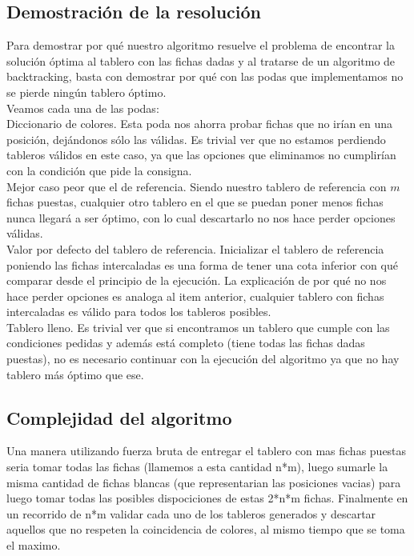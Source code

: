 \subsection{Demostraci\'on de la resoluci\'on}

Para demostrar por qu\'e nuestro algoritmo resuelve el problema de encontrar la soluci\'on \'optima al tablero con las fichas dadas y al tratarse de un algoritmo de backtracking, basta con demostrar por qu\'e con las podas que implementamos no se pierde ning\'un tablero \'optimo.\\

Veamos cada una de las podas:\\

Diccionario de colores. Esta poda nos ahorra probar fichas que no ir\'ian en una posici\'on, dej\'andonos s\'olo las v\'alidas. Es trivial ver que no estamos perdiendo tableros v\'alidos en este caso, ya que las opciones que eliminamos no cumplir\'ian con la condici\'on que pide la consigna.\\

Mejor caso peor que el de referencia. Siendo nuestro tablero de referencia con $m$ fichas puestas, cualquier otro tablero en el que se puedan poner menos fichas nunca llegar\'a a ser \'optimo, con lo cual descartarlo no nos hace perder opciones v\'alidas.\\

Valor por defecto del tablero de referencia. Inicializar el tablero de referencia poniendo las fichas intercaladas es una forma de tener una cota inferior con qu\'e comparar desde el principio de la ejecuci\'on. La explicaci\'on de por qu\'e no nos hace perder opciones es analoga al item anterior, cualquier tablero con fichas intercaladas es v\'alido para todos los tableros posibles. \\

Tablero lleno. Es trivial ver que si encontramos un tablero que cumple con las condiciones pedidas y adem\'as est\'a completo (tiene todas las fichas dadas puestas), no es necesario continuar con la ejecuci\'on del algoritmo ya que no hay tablero m\'as \'optimo que ese.\\

\subsection{Complejidad del algoritmo}

Una manera utilizando fuerza bruta de entregar el tablero con mas fichas puestas seria tomar todas las fichas (llamemos a esta cantidad n*m), luego sumarle la misma cantidad de fichas blancas (que representarian las posiciones vacias) para luego tomar todas las posibles dispociciones de estas 2*n*m fichas. Finalmente en un recorrido de n*m validar cada uno de los tableros generados y descartar aquellos que no respeten la coincidencia de colores, al mismo tiempo que se toma el maximo. \\

